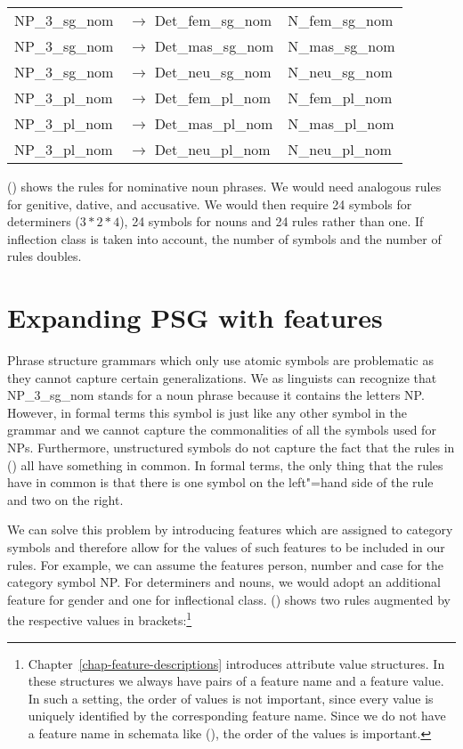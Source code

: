 \begin{tabular}[t]{@{}l@{ }l@{~~}l}
NP\_3\_sg\_nom  & $\to$ Det\_fem\_sg\_nom & N\_fem\_sg\_nom \\
NP\_3\_sg\_nom  & $\to$ Det\_mas\_sg\_nom & N\_mas\_sg\_nom \\
NP\_3\_sg\_nom  & $\to$ Det\_neu\_sg\_nom & N\_neu\_sg\_nom \\
NP\_3\_pl\_nom  & $\to$ Det\_fem\_pl\_nom & N\_fem\_pl\_nom \\
NP\_3\_pl\_nom  & $\to$ Det\_mas\_pl\_nom & N\_mas\_pl\_nom \\
NP\_3\_pl\_nom  & $\to$ Det\_neu\_pl\_nom & N\_neu\_pl\_nom \\[2mm]
\end{tabular}
\z
() shows the rules for nominative noun phrases. We would need analogous rules for genitive,
dative, and accusative. We would then require 24 symbols for determiners ($3*2*4$), 24 symbols for nouns and
24 rules rather than one. If inflection class is taken into account, the number of symbols and the
number of rules doubles. 

\section{Expanding PSG with features}
\label{sec-PSG-Merkmale}

Phrase structure grammars which only use atomic symbols are problematic as they cannot capture certain generalizations.
We as linguists can recognize that NP\_3\_sg\_nom stands for a noun phrase because it contains the letters NP. 
However, in formal terms this symbol is just like any other symbol in the grammar and we cannot capture the commonalities
of all the symbols used for NPs. Furthermore, unstructured symbols do not capture the fact that the rules in () 
all have something in common. In formal terms, the only thing that the rules have in common is that there is one symbol on the
left"=hand side of the rule and two on the right.

We can solve this problem by introducing features which are assigned to category symbols and therefore allow for the values of
such features to be included in our rules. For example, we can assume the features person, number and case for the category
symbol NP. For determiners and nouns, we would adopt an additional feature for gender and one for
inflectional class. () shows two rules augmented by the respective values in brackets:\footnote{%
  Chapter~\ref{chap-feature-descriptions} introduces attribute value structures. In these structures we always
have pairs of a feature name and a feature value. In such a setting, the order of values is not
important, since every value is uniquely identified by the corresponding feature name. Since we do not have a feature name
in schemata like (), the order of the values is important.
}

